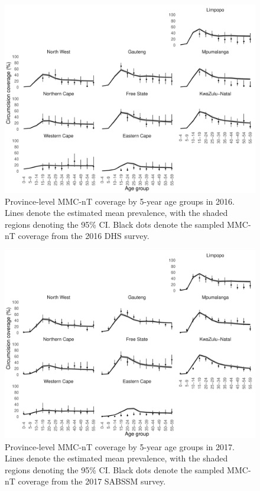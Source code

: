 \documentclass{article}
\begin{document}
\begin{appendix}

\begin{figure}[H]
	\centering
	\includegraphics[width = \linewidth]{Figures/suppmat/ModelFit/MMCnTPrev_5year_Province_2016_withsurveypoints}
	\caption{Province-level MMC-nT coverage by 5-year age groups in 2016. Lines denote the estimated mean prevalence, with the shaded regions denoting the 95\% CI. Black dots denote the sampled MMC-nT coverage from the 2016 DHS survey.}
\end{figure}


\begin{figure}[H]
	\centering
	\includegraphics[width = \linewidth]{Figures/suppmat/ModelFit/MMCnTPrev_5year_Province_2017_withsurveypoints}
	\caption{Province-level MMC-nT coverage by 5-year age groups in 2017. Lines denote the estimated mean prevalence, with the shaded regions denoting the 95\% CI. Black dots denote the sampled MMC-nT coverage from the 2017 SABSSM survey.}
\end{figure}


\end{appendix}
\end{document}
